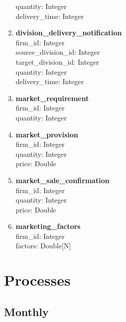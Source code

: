 \documentclass[11pt]{article}
\begin{document}
\begin{enumerate}
	quantity: Integer \\
	delivery\_time: Integer
	\item \textbf{division\_delivery\_notification} \\
	firm\_id: Integer \\
	source\_division\_id: Integer \\
	target\_division\_id: Integer \\
	quantity: Integer \\
	delivery\_time: Integer
	\item \textbf{market\_requirement} \\
	firm\_id: Integer \\
	quantity: Integer
	\item \textbf{market\_provision} \\
	firm\_id: Integer \\
	quantity: Integer \\
	price: Double
	\item \textbf{market\_sale\_confirmation} \\
	firm\_id: Integer \\
	quantity: Integer \\
	price: Double
	\item \textbf{marketing\_factors} \\
	firm\_id: Integer \\
	factors: Double[N]
\end{enumerate}

\section{Processes}

\subsection{Monthly}
\end{document}
